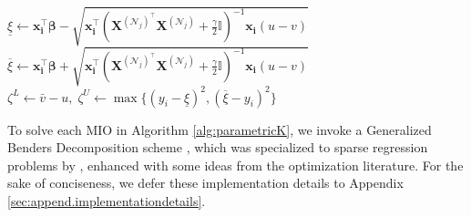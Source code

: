 \documentclass[mnsc,nonblindrev]{informs3} %
\begin{document}
\begin{algorithm}[h!] 
	\caption{$\texttt{compute\_bounds}(\mathcal{N}_j,\bm{\beta},\bar v,v,u)$}
	\label{alg:bounds}
 $\underline{\xi}\gets\bm{x_i^\top\beta}-\sqrt{\bm{x_i^\top}\left(\bm{X}^{(\mathcal{N}_j)^\top} \bm{X}^{(\mathcal{N}_j)}+\frac{\gamma}{2}\mathbb{I}\right)^{-1}\bm{x_i}\left(u-v\right)}$\\
$\overline{\xi}\gets\bm{x_i^\top\beta}+\sqrt{\bm{x_i^\top}\left(\bm{X}^{(\mathcal{N}_j)^\top} \bm{X}^{(\mathcal{N}_j)}+\frac{\gamma}{2}\mathbb{I}\right)^{-1}\bm{x_i}\left(u-v\right)}$\\
  $\zeta^L\gets \bar v-u,\; \zeta^U\gets \max\{(y_i-\underline{\xi})^2, (\overline{\xi}-y_i)^2\}$\\
\end{algorithm}

To solve each MIO in Algorithm \ref{alg:parametricK}, we invoke a Generalized Benders Decomposition scheme \citep{geoffrion1972generalized}, which was specialized to sparse regression problems by \cite{bertsimas2020sparse}, enhanced with some ideas from the optimization literature. For the sake of conciseness, we defer these implementation details to Appendix \ref{sec:append.implementationdetails}.

\end{document}
